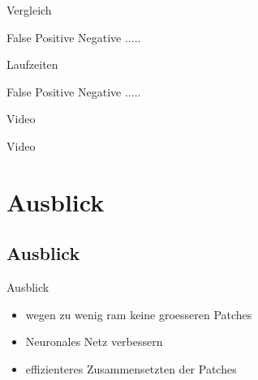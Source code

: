 \begin{frame}{Vergleich}

      False Positive Negative .....

\end{frame}

\begin{frame}{Laufzeiten}

      False Positive Negative .....

\end{frame}

\begin{frame}{Video}

      Video

\end{frame}

\section{Ausblick}
\subsection{Ausblick}
\begin{frame}{Ausblick}
    \begin{itemize}
        \item wegen zu wenig ram keine groesseren Patches
        \item Neuronales Netz verbessern
        \item effizienteres Zusammensetzten der Patches
    \end{itemize}

\end{frame}